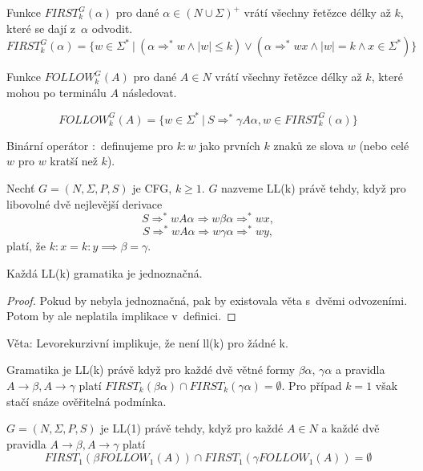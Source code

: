 \begin{definition}
    Funkce $FIRST^G_k(\alpha)$ pro dané $\alpha \in (N \cup \Sigma)^+$
    vrátí všechny řetězce délky až $k$, které se dají z~$\alpha$
    odvodit.
	\[
		FIRST^G_k(\alpha)= \{ w \in \Sigma^*~|~(\alpha \Rightarrow^* w \land |w| \leq k) \lor (\alpha \Rightarrow^* wx \land |w| = k \land x \in \Sigma^*) \}
	\]

    Funkce $FOLLOW^G_k(A)$ pro dané $A \in N$
    vrátí všechny řetězce délky až $k$, které mohou po terminálu $A$
    následovat.

	\[
		FOLLOW^G_k(A) = \{ w \in \Sigma^*~|~S \Rightarrow^* \gamma A \alpha, w \in FIRST^G_k(\alpha) \}
	\]

    Binární operátor ${:}$ definujeme pro $k : w$ jako prvních $k$ znaků
    ze slova $w$ (nebo celé $w$ pro $w$ kratší než $k$).
\end{definition}

\begin{definition}[LL(k) gramatiky]
    Nechť $G = (N, \Sigma, P, S)$ je CFG, $k \geq 1$. $G$ nazveme LL(k)
    právě tehdy, když pro libovolné dvě nejlevější derivace
	\[
		S \Rightarrow^* wA\alpha \Rightarrow w\beta\alpha \Rightarrow^* wx,
	\]
    \[ 
		S \Rightarrow^* wA\alpha \Rightarrow w\gamma\alpha \Rightarrow^* wy,
	\]
    platí, že $k : x = k : y \implies \beta = \gamma$.
\end{definition}

\begin{theorem}
    Každá LL(k) gramatika je jednoznačná.
\end{theorem}

\begin{proof}
Pokud by nebyla jednoznačná, pak by existovala věta s~dvěmi odvozeními.
Potom by ale neplatila implikace v~definici.
\end{proof}

Věta: Levorekurzivní implikuje, že není ll(k) pro žádné k.

Gramatika je LL(k) právě když pro každé dvě větné formy $\beta \alpha$,
$\gamma \alpha$ a pravidla $A \to \beta, A \to \gamma$
platí $FIRST_k(\beta \alpha) \cap FIRST_k(\gamma \alpha) = \emptyset$.
Pro případ $k = 1$ však stačí snáze ověřitelná podmínka.

\begin{theorem}
    $G = (N, \Sigma, P, S)$ je LL(1) právě tehdy, když
    pro každé $A \in N$
    a každé dvě pravidla $A \to \beta, A \to \gamma$
    platí
    \[
        FIRST_1(\beta FOLLOW_1(A)) \cap FIRST_1(\gamma FOLLOW_1(A)) = \emptyset
    \]
\end{theorem}

